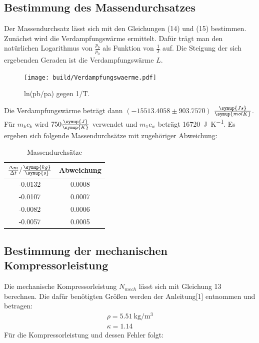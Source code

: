 \subsection{Bestimmung des Massendurchsatzes}
Der Massendurchsatz lässt sich mit den Gleichungen (14) und (15) bestimmen. Zunächst
wird die Verdampfungswärme ermittelt. Dafür trägt man den natürlichen Logarithmus von
$\frac{p_b}{p_0}$ als Funktion von $\frac{1}{T}$ auf. Die Steigung der sich ergebenden
Geraden ist die Verdampfungswärme $L$.
\begin{figure}[H]
  \centering
  \texttt{[image: build/Verdampfungswaerme.pdf]}
  \caption{ln(pb/pa) gegen 1/T.}
  \label{fig:Verdampfungswaerme}
\end{figure}
Die Verdampfungswärme beträgt dann $(-15513.4058 \pm 903.7570)$ $\frac{\symup{Js}}{\symup{molK}}$.
Für $m_kc_k$ wird $750 \frac{\symup{J}}{\symup{K}}$ verwendet und $m_1c_w$ beträgt \SI{16720}{\joule\per\kelvin}.
Es ergeben sich folgende Massendurchsätze mit zugehöriger Abweichung:
\begin{table}
  \centering
  \caption{Massendurchsätze}
  \label{tab:Massendurchsätze}
  \begin{tabular}{c c}
    \toprule
    $\frac{\Delta m}{\Delta t}/\frac{\symup{kg}}{\symup{s}}$ & Abweichung \\
    \midrule
    -0.0132 & 0.0008 \\
    -0.0107 & 0.0007 \\
    -0.0082 & 0.0006 \\
    -0.0057 & 0.0005 \\
    \bottomrule
  \end{tabular}
\end{table}
\subsection{Bestimmung der mechanischen Kompressorleistung}
Die mechanische Kompressorleistung $N_{mech}$ lässt sich mit Gleichung 13 berechnen. Die dafür
benötigten Größen werden der Anleitung[1] entnommen und betragen:
\begin{align}
  \rho = \SI{5.51}{\kilo\gram\per\cubic\meter} \\
  \kappa = 1.14
\end{align}
Für die Kompressorleistung und dessen Fehler folgt:
